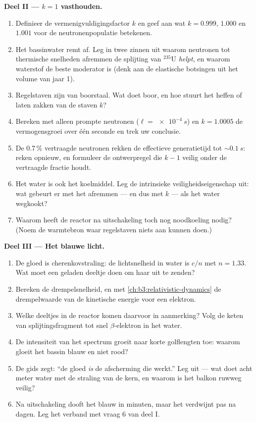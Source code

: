 \begin{problem}
\medskip\noindent\textbf{Deel II --- $k = 1$ vasthouden.}

\begin{enumerate}[resume]
  \item Definieer de vermenigvuldigingsfactor $k$ en geef aan wat
        $k = 0.999$, $1.000$ en $1.001$ voor de neutronenpopulatie
        betekenen.
  \item Het bassinwater remt af. Leg in twee zinnen uit waarom
        neutronen tot thermische snelheden afremmen de splijting van
        $^{235}$U \emph{helpt}, en waarom waterstof de beste moderator is
        (denk aan de elastische botsingen uit het volume van jaar 1).
  \item Regelstaven zijn van boorstaal. Wat doet boor, en
        hoe stuurt het heffen of laten zakken van de staven $k$?
  \item Bereken met alleen prompte neutronen ($\ell = \qty{e-4}{s}$) en
        $k = 1.0005$ de vermogensgroei over één seconde
        en trek uw conclusie.
  \item De 0.7\,\% vertraagde neutronen rekken de effectieve
        generatietijd tot $\sim\qty{0.1}{s}$: reken opnieuw, en
        formuleer de ontwerpregel die $k - 1$ veilig onder
        de vertraagde fractie houdt.
  \item Het water is ook het koelmiddel. Leg de intrinsieke
        veiligheidseigenschap uit: wat gebeurt er met het afremmen --- en dus
        met $k$ --- als het water wegkookt?
  \item Waarom heeft de reactor na uitschakeling toch nog noodkoeling
        nodig? (Noem de warmtebron waar regelstaven niets aan
        kunnen doen.)
\end{enumerate}

\medskip\noindent\textbf{Deel III --- Het blauwe licht.}

\begin{enumerate}[resume]
  \item De gloed is cherenkovstraling: de lichtsnelheid in water
        is $c/n$ met $n = 1.33$. Wat moet een geladen deeltje doen
        om haar uit te zenden?
  \item Bereken de drempelsnelheid, en met
        \cref{ch:b3:relativistic-dynamics} de drempelwaarde van de kinetische
        energie voor een elektron.
  \item Welke deeltjes in de reactor komen daarvoor in aanmerking? Volg de keten van
        splijtingsfragment tot snel $\beta$-elektron in het water.
  \item De intensiteit van het spectrum groeit naar korte golflengten toe:
        waarom gloeit het bassin blauw en niet rood?
  \item De gids zegt: ``de gloed \emph{is} de afscherming die
        werkt.'' Leg uit --- wat doet acht meter water
        met de straling van de kern, en waarom is het balkon ruwweg
        veilig?
  \item Na uitschakeling dooft het blauw in minuten, maar het verdwijnt pas
        na dagen. Leg het verband met vraag 6 van deel I.
\end{enumerate}


\end{problem}
